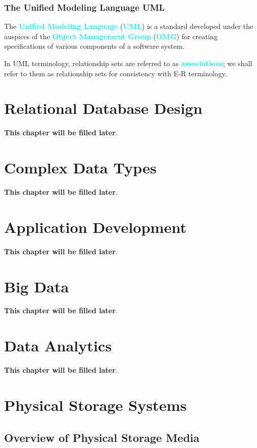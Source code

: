 \documentclass[a4paper,12pt,twoside,openany]{book}
\newcommand{\textcy}[1]{\textbf{\textcolor{cyan}{#1}}}
\begin{document}
\subsection{The Unified Modeling Language UML}

The \textcy{Unified Modeling Language} (\textcy{UML}) is a standard developed under the auspices of the \textcy{Object Management Group} (\textcy{OMG}) for creating specifications of various components of a software system.

In UML terminology, relationship sets are referred to as \textcy{associations}; we shall refer to them as relationship sets for consistency with E-R terminology.

\chapter{Relational Database Design}

\textbf{This chapter will be filled later}.

\chapter{Complex Data Types}

\textbf{This chapter will be filled later}.

\chapter{Application Development}

\textbf{This chapter will be filled later}.

\chapter{Big Data}

\textbf{This chapter will be filled later}.

\chapter{Data Analytics}

\textbf{This chapter will be filled later}.

\chapter{Physical Storage Systems}
\section{Overview of Physical Storage Media}
\end{document}
